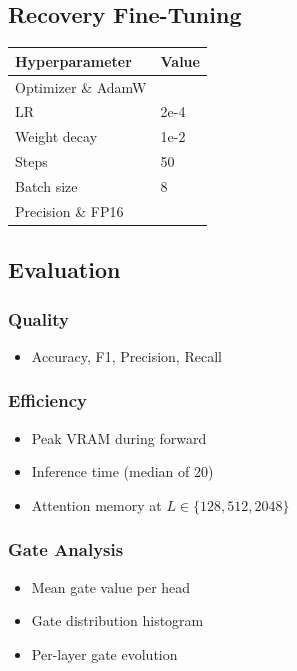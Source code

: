 \subsection{Recovery Fine-Tuning}

\begin{table}[H]
\centering
\small
\begin{tabular}{ll}
\toprule
\textbf{Hyperparameter} & \textbf{Value} \\
\midrule
Optimizer \& AdamW \\
LR & 2e-4 \\
Weight decay & 1e-2 \\
Steps & 50 \\
Batch size & 8 \\
Precision \& FP16 \\
\bottomrule
\end{tabular}
\end{table}

\subsection{Evaluation}

\subsubsection{Quality}
\begin{itemize}
\item Accuracy, F1, Precision, Recall

\end{itemize}
\subsubsection{Efficiency}
\begin{itemize}
\item Peak VRAM during forward
\item Inference time (median of 20)
\item Attention memory at $L \in \{128, 512, 2048\}$

\end{itemize}
\subsubsection{Gate Analysis}
\begin{itemize}
\item Mean gate value per head
\item Gate distribution histogram
\item Per-layer gate evolution

\end{itemize}
